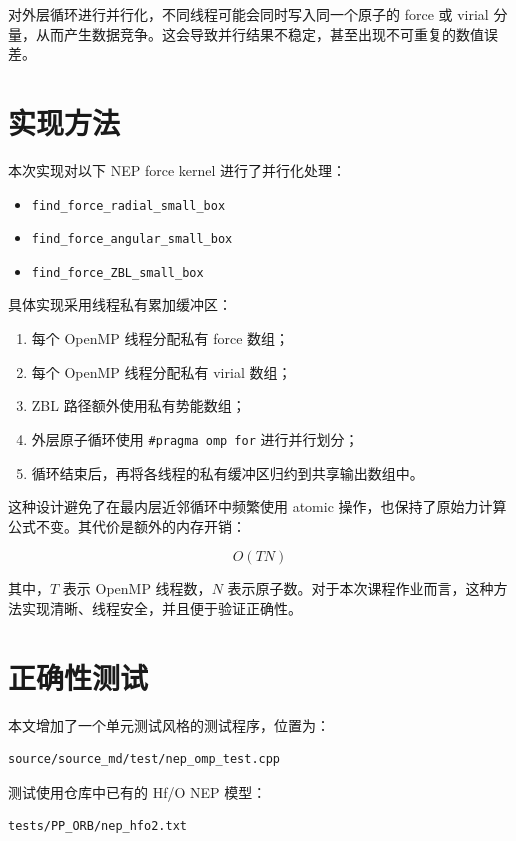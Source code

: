 \documentclass[11pt]{article}
\begin{document}
对外层循环进行并行化，不同线程可能会同时写入同一个原子的 force 或 virial 分量，从而产生数据竞争。这会导致并行结果不稳定，甚至出现不可重复的数值误差。

\section{实现方法}

本次实现对以下 NEP force kernel 进行了并行化处理：

\begin{itemize}
  \item \texttt{find\_force\_radial\_small\_box}
  \item \texttt{find\_force\_angular\_small\_box}
  \item \texttt{find\_force\_ZBL\_small\_box}
\end{itemize}

具体实现采用线程私有累加缓冲区：

\begin{enumerate}
  \item 每个 OpenMP 线程分配私有 force 数组；
  \item 每个 OpenMP 线程分配私有 virial 数组；
  \item ZBL 路径额外使用私有势能数组；
  \item 外层原子循环使用 \texttt{\#pragma omp for} 进行并行划分；
  \item 循环结束后，再将各线程的私有缓冲区归约到共享输出数组中。
\end{enumerate}

这种设计避免了在最内层近邻循环中频繁使用 atomic 操作，也保持了原始力计算公式不变。其代价是额外的内存开销：

\[
  O(TN)
\]

其中，\(T\) 表示 OpenMP 线程数，\(N\) 表示原子数。对于本次课程作业而言，这种方法实现清晰、线程安全，并且便于验证正确性。

\section{正确性测试}

本文增加了一个单元测试风格的测试程序，位置为：

\begin{lstlisting}
source/source_md/test/nep_omp_test.cpp
\end{lstlisting}

测试使用仓库中已有的 Hf/O NEP 模型：

\begin{lstlisting}
tests/PP_ORB/nep_hfo2.txt
\end{lstlisting}
\end{document}
